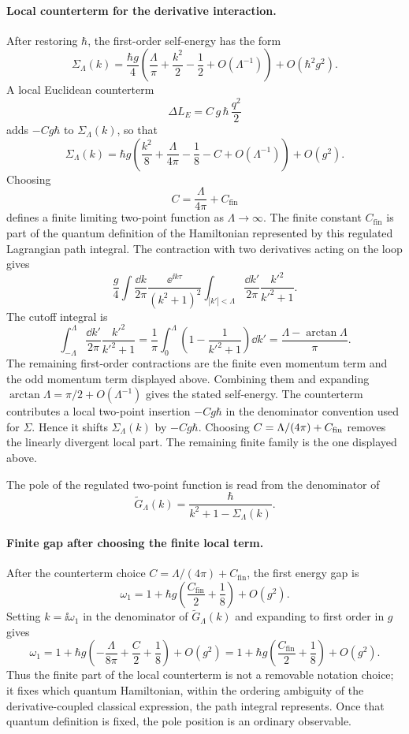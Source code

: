 \paragraph{Local counterterm for the derivative interaction.}
After restoring \(\hbar\), the first-order self-energy has the form
\[
  \Sigma_\Lambda(k)
  =
  \frac{\hbar g}{4}
  \left(
    \frac{\Lambda}{\pi}
    +\frac{k^2}{2}
    -\frac12
    +O(\Lambda^{-1})
  \right)
  +O(\hbar^2g^2).
\]
A local Euclidean counterterm
\[
  \Delta L_E=C\,g\,\hbar\,\frac{q^2}{2}
\]
adds \(-Cg\hbar\) to \(\Sigma_\Lambda(k)\), so that
\[
  \Sigma_\Lambda(k)
  =
  \hbar g
  \left(
    \frac{k^2}{8}
    +\frac{\Lambda}{4\pi}
    -\frac18
    -C
    +O(\Lambda^{-1})
  \right)
  +O(g^2).
\]
Choosing
\[
  C=\frac{\Lambda}{4\pi}+C_{\mathrm{fin}}
\]
defines a finite limiting two-point function as \(\Lambda\to\infty\). The
finite constant \(C_{\mathrm{fin}}\) is part of the quantum definition of the
Hamiltonian represented by this regulated Lagrangian path integral.
The contraction with two derivatives acting on the loop gives
\[
  \frac{g}{4}
  \int\frac{\dd k}{2\pi}
    \frac{\ee^{\ii k\tau}}{(k^2+1)^2}
  \int_{|k'|<\Lambda}\frac{\dd k'}{2\pi}
    \frac{k'^2}{k'^2+1}.
\]
The cutoff integral is
\[
  \int_{-\Lambda}^{\Lambda}\frac{\dd k'}{2\pi}
  \frac{k'^2}{k'^2+1}
  =
  \frac{1}{\pi}\int_0^\Lambda
  \left(1-\frac{1}{k'^2+1}\right)\dd k'
  =
  \frac{\Lambda-\arctan\Lambda}{\pi}.
\]
The remaining first-order contractions are the finite even momentum term and
the odd momentum term displayed above.  Combining them and expanding
\(\arctan\Lambda=\pi/2+O(\Lambda^{-1})\) gives the stated self-energy.
The counterterm contributes a local two-point insertion \(-Cg\hbar\) in the
denominator convention used for \(\Sigma\).  Hence it shifts
\(\Sigma_\Lambda(k)\) by \(-Cg\hbar\).  Choosing
\(C=\Lambda/(4\pi)+C_{\rm fin}\) removes the linearly divergent local part.
The remaining finite family is the one displayed above.

The pole of the regulated two-point function is read from the denominator of
\[
  \widetilde G_\Lambda(k)
  =
  \frac{\hbar}{k^2+1-\Sigma_\Lambda(k)}.
\]

\paragraph{Finite gap after choosing the finite local term.}
After the counterterm choice
\(C=\Lambda/(4\pi)+C_{\mathrm{fin}}\), the
first energy gap is
\[
  \omega_1
  =
  1+\hbar g
  \left(
    \frac{C_{\mathrm{fin}}}{2}+\frac18
  \right)
  +O(g^2).
\]
Setting \(k=\ii\omega_1\) in the denominator of
\(\widetilde G_\Lambda(k)\) and expanding to first
order in \(g\) gives
\[
  \omega_1
  =
  1+\hbar g
  \left(
    -\frac{\Lambda}{8\pi}+\frac{C}{2}+\frac18
  \right)
  +O(g^2)
  =
  1+\hbar g
  \left(
    \frac{C_{\mathrm{fin}}}{2}+\frac18
  \right)
  +O(g^2).
\]
Thus the finite part of the local counterterm is not a removable notation
choice; it fixes which quantum Hamiltonian, within the ordering ambiguity of
the derivative-coupled classical expression, the path integral represents.
Once that quantum definition is fixed, the pole position is an ordinary
observable.

